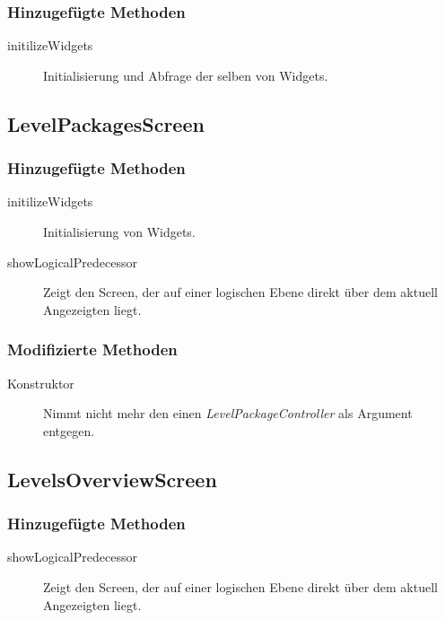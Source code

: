 \subsubsection{Hinzugefügte Methoden}
\begin{description}
\item[initilizeWidgets]
Initialisierung und Abfrage der selben von Widgets.

\end{description}



\subsection{LevelPackagesScreen}

\subsubsection{Hinzugefügte Methoden}
\begin{description}
\item[initilizeWidgets]
Initialisierung von Widgets.
\item[showLogicalPredecessor]
Zeigt den Screen, der auf einer logischen Ebene direkt über dem aktuell Angezeigten liegt.

\end{description}

\subsubsection{Modifizierte Methoden}
\begin{description}
\item[Konstruktor]
Nimmt nicht mehr den einen \emph{LevelPackageController} als Argument entgegen.

\end{description}


\subsection{LevelsOverviewScreen}
\subsubsection{Hinzugefügte Methoden}
\begin{description}
\item[showLogicalPredecessor]
Zeigt den Screen, der auf einer logischen Ebene direkt über dem aktuell Angezeigten liegt.

\end{description}


